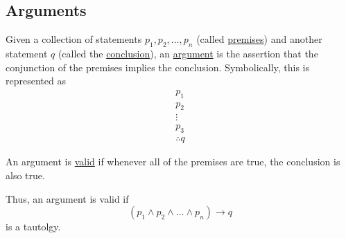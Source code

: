 \subsection{Arguments}
\begin{definition}
    Given a collection of statements $p_1,p_2,\dots,p_n$ (called \underline{premises}) and another statement $q$ (called the \underline{conclusion}), an \underline{argument} is the assertion that the conjunction of the premises implies the conclusion. Symbolically, this is represented as \begin{align*}p_1 \\ p_2 \\ \vdots \\ p_3 \\ \therefore q\end{align*}
\end{definition}

\begin{definition}
    An argument is \underline{valid} if whenever all of the premises are true, the conclusion is also true.

    Thus, an argument is valid if $$\left(p_1\land p_2 \land \dots \land p_n\right)\rightarrow q$$ is a tautolgy.
\end{definition}

